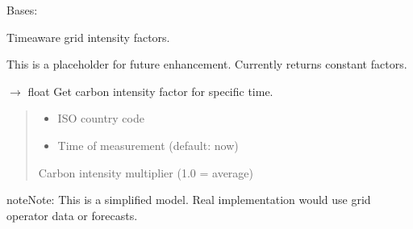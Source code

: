 \documentclass[letterpaper,10pt,english]{sphinxmanual}
\begin{document}
\begin{fulllineitems}
\label{\detokenize{core.sustainability.utils.time_aware_factors:core.sustainability.utils.time_aware_factors.TimeAwareGridFactors}}
\pysigstartsignatures
\pysiglinewithargsret
{}
{}
{}
\pysigstopsignatures
\sphinxAtStartPar
Bases: 

\sphinxAtStartPar
Time\sphinxhyphen{}aware grid intensity factors.

\sphinxAtStartPar
This is a placeholder for future enhancement.
Currently returns constant factors.

\begin{fulllineitems}
\label{\detokenize{core.sustainability.utils.time_aware_factors:core.sustainability.utils.time_aware_factors.TimeAwareGridFactors.get_factor_at_time}}
\pysigstartsignatures
\pysiglinewithargsret
{}
{\sphinxparamcomma {}}
{{ $\rightarrow$ float}}
\pysigstopsignatures
\sphinxAtStartPar
Get carbon intensity factor for specific time.
\begin{quote}\begin{description}
\begin{itemize}
\item {} 
\sphinxAtStartPar
{} \textendash{} ISO country code

\item {} 
\sphinxAtStartPar
{} \textendash{} Time of measurement (default: now)

\end{itemize}

\sphinxAtStartPar
Carbon intensity multiplier (1.0 = average)

\end{description}\end{quote}

\begin{sphinxadmonition}{note}{Note:}
\sphinxAtStartPar
This is a simplified model. Real implementation would use
grid operator data or forecasts.
\end{sphinxadmonition}

\end{fulllineitems}


\end{fulllineitems}
\end{document}
